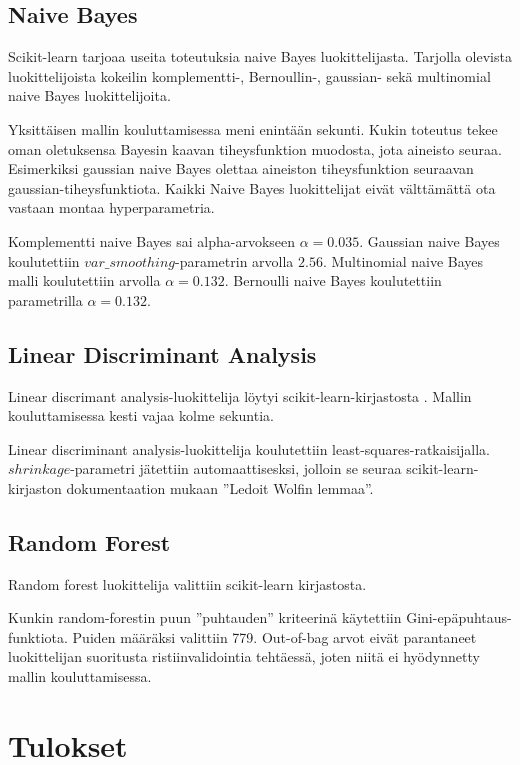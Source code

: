 \documentclass[finnish,twoside,openright]{HYgraduMLDS}
\begin{document}
\subsection{Naive Bayes}

Scikit-learn \cite{scikit-learn} tarjoaa useita toteutuksia naive Bayes luokittelijasta. Tarjolla olevista luokittelijoista kokeilin komplementti-, Bernoullin-, gaussian- sekä multinomial naive Bayes luokittelijoita. 

Yksittäisen mallin kouluttamisessa meni enintään sekunti. Kukin toteutus tekee oman oletuksensa Bayesin kaavan tiheysfunktion muodosta, jota aineisto seuraa. Esimerkiksi gaussian naive Bayes olettaa aineiston tiheysfunktion seuraavan gaussian-tiheysfunktiota. Kaikki Naive Bayes luokittelijat eivät välttämättä ota vastaan montaa hyperparametria.

Komplementti naive Bayes sai alpha-arvokseen $\alpha = 0.035$. Gaussian naive Bayes koulutettiin $var\_smoothing$-parametrin arvolla $2.56$. Multinomial naive Bayes malli koulutettiin arvolla $\alpha = 0.132$. Bernoulli naive Bayes koulutettiin parametrilla $\alpha = 0.132$.


\subsection{Linear Discriminant Analysis}

Linear discrimant analysis-luokittelija löytyi scikit-learn-kirjastosta \cite{scikit-learn}. Mallin kouluttamisessa kesti vajaa kolme sekuntia.

Linear discriminant analysis-luokittelija koulutettiin least-squares-ratkaisijalla. $shrinkage$-parametri jätettiin automaattisesksi, jolloin se seuraa scikit-learn-kirjaston dokumentaation mukaan ''Ledoit Wolfin lemmaa''.

\subsection{Random Forest}

Random forest luokittelija valittiin scikit-learn \cite{scikit-learn} kirjastosta. 

Kunkin random-forestin puun ''puhtauden'' kriteerinä käytettiin Gini-epäpuhtaus-funktiota. Puiden määräksi valittiin 779. Out-of-bag arvot eivät parantaneet luokittelijan suoritusta ristiinvalidointia tehtäessä, joten niitä ei hyödynnetty mallin kouluttamisessa.


\section{Tulokset}
\end{document}
